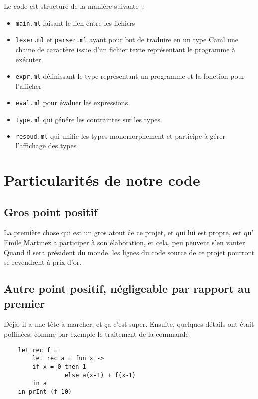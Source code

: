 \documentclass{article}
\begin{document}
Le code est structuré de la manière suivante~:
	
\begin{itemize}[label = $\star$]	
	\item \texttt{main.ml} faisant le lien entre les fichiers
	\newline
	\item \texttt{lexer.ml} et \texttt{parser.ml} ayant pour but de traduire en un type Caml une chaine de caractère issue d'un fichier texte représentant le programme à exécuter. 
	\newline
	\item \texttt{expr.ml} définissant le type représentant un programme et la fonction pour l'afficher
	\newline
	\item \texttt{eval.ml} pour évaluer les expressions.
	\newline
	\item \texttt{type.ml} qui génére les contraintes sur les types
	\newline
	\item \texttt{resoud.ml} qui unifie les types monomorphement et participe à gérer l'affichage des types
\end{itemize}

\section{Particularités de notre code}
\label{parti}

\subsection{Gros point positif}
La première chose qui est un gros atout de ce projet, et qui lui est propre, est qu' \underline{Emile Martinez} a participer à son élaboration, et cela, peu peuvent s'en vanter. Quand il sera président du monde, les lignes du code source de ce projet pourront se revendrent à prix d'or.

\subsection{Autre point positif, négligeable par rapport au premier}
Déjà, il a une tête à marcher, et ça c'est super. Ensuite, quelques détails ont était poffinées, comme par exemple le traitement de la commande \begin{verbatim}
	let rec f = 
	    let rec a = fun x -> 
	    if x = 0 then 1 
	             else a(x-1) + f(x-1) 
	    in a 
	in prInt (f 10)
\end{verbatim}
\end{document}
